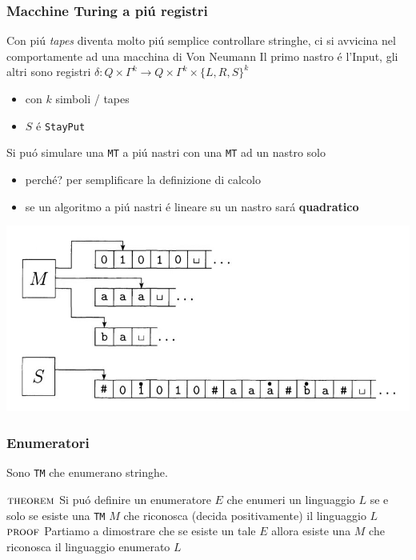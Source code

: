 \documentclass[
                        12pt, %
                        a4paper, %
                        oneside, %
                        headinclude,footinclude, %
                        BCOR5mm, %
                  ]{scrartcl}
\begin{document}
\subsubsection{Macchine Turing a piú registri}
\label{sec:orgc5d85d2}
Con piú \emph{tapes} diventa molto piú semplice controllare stringhe, ci si avvicina nel comportamente ad una macchina di Von Neumann
Il primo nastro é l'Input, gli altri sono registri
\(\delta: Q \times \Gamma^{k} \longrightarrow Q \times \Gamma^{k} \times \{L,R,S\}^{k}\)
\begin{itemize}
\item con \(k\) simboli / tapes
\item \(S\) é \texttt{StayPut}
\end{itemize}

Si puó simulare una \texttt{MT} a piú nastri con una \texttt{MT} ad un nastro solo
\begin{itemize}
\item perché? per semplificare la definizione di calcolo
\item se un algoritmo a piú nastri é lineare su un nastro sará \textbf{quadratico}
\end{itemize}
\begin{center}
\includegraphics[width=.9\linewidth]{../media/img/3tapes1tape.jpg}
\end{center}
\subsubsection{Enumeratori}
\label{sec:org0013b3c}
Sono \texttt{TM} che enumerano stringhe.

\(\textsc{theorem}\)     Si puó definire un enumeratore \(E\) che enumeri un linguaggio \(L\) se e solo se esiste una \texttt{TM} \(M\) che riconosca (decida positivamente) il linguaggio \(L\)
\(\textsc{proof}\)      Partiamo a dimostrare che se esiste un tale \(E\) allora esiste una \(M\) che riconosca il linguaggio enumerato \(L\)
\end{document}
